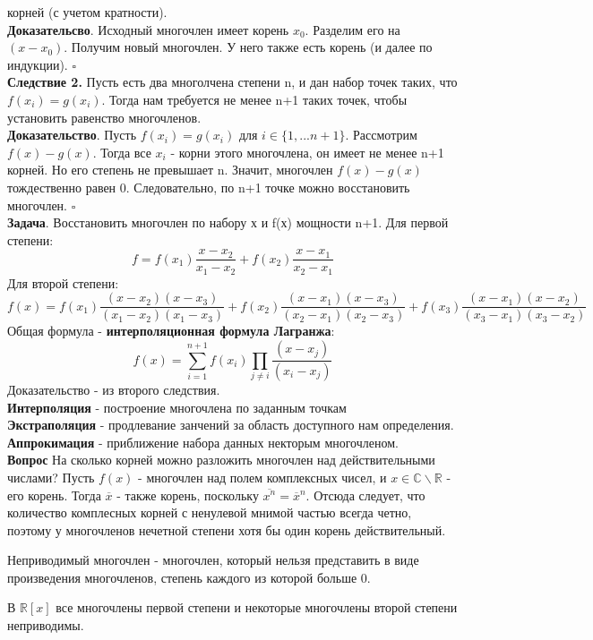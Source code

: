 корней (с учетом кратности).\\
\textbf{Доказательсво}. Исходный многочлен имеет корень $x_0$. Разделим его на
$(x-x_0)$. Получим новый многочлен. У него также есть корень 
(и далее по индукции). $\square$\\
\textbf{Следствие 2.} Пусть есть два многолчена степени n, и дан набор точек
таких, что $f(x_i)=g(x_i)$. Тогда нам требуется не менее n+1 таких точек, 
чтобы установить равенство многочленов. \\
\textbf{Доказательство}. Пусть $f(x_i)=g(x_i)$ для $i\in\{1,...n+1\}$. 
Рассмотрим $f(x)-g(x)$. Тогда все $x_i$ - корни этого многочлена, он имеет не
менее n+1 корней. Но его степень не превышает n. Значит, многочлен $f(x)-g(x)$ 
тождественно равен 0. Следовательно, по n+1 точке можно восстановить многочлен.
$\square$\\
\textbf{Задача}. Восстановить многочлен по набору х и f(х) мощности n+1. 
Для первой степени:
$$f=f(x_1)\frac{x-x_2}{x_1-x_2}+f(x_2)\frac{x-x_1}{x_2-x_1}$$
Для второй степени: $$f(x)=f(x_1)\frac{(x-x_2)(x-x_3)}{(x_1-x_2)(x_1-x_3)}+f(x_2)
\frac{(x-x_1)(x-x_3)}{(x_2-x_1)(x_2-x_3)}+f(x_3)\frac{(x-x_1)(x-x_2)}{(x_3-x_1)
(x_3-x_2)}$$
Общая формула - \textbf{интерполяционная формула Лагранжа}:
$$f(x)=\sum\limits_{i=1}^{n+1}f(x_i) \prod\limits_{j\ne i}\frac{(x-x_j)}
{(x_i-x_j)}$$
Доказательство - из второго следствия. \\
\textbf{Интерполяция} - построение многочлена по заданным точкам\\
\textbf{Экстраполяция} - продлевание занчений за область доступного нам
определения.\\
\textbf{Аппрокимация} - приближение набора данных некторым многочленом. \\
\textbf{Вопрос} На сколько корней можно разложить многочлен над
действительными числами?
Пусть $f(x)$ - многочлен над полем комплексных чисел, и
$x\in\mathbb C\backslash\mathbb R$ - его корень. Тогда $\overline{x}$ - 
также корень, поскольку $\overline{x^n}=\overline{x}^n$. Отсюда следует, 
что количество комплесных корней с ненулевой мнимой частью всегда четно, 
поэтому у многочленов нечетной степени хотя бы один корень действительный.\\
\begin{defin}
Неприводимый многочлен - многочлен, который нельзя представить в виде 
произведения многочленов, степень каждого из которой больше 0. 
\end{defin}
В $\mathbb R[x]$ все многочлены первой степени и некоторые многочлены второй
степени неприводимы.\\
